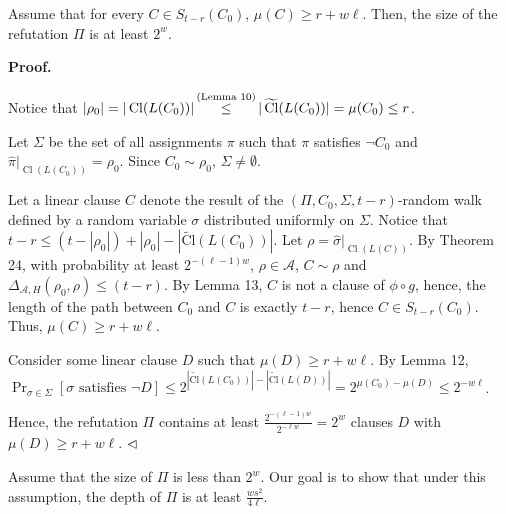 \documentclass[10pt,a4paper]{article}
\begin{document}
Assume that for every $C\in S_{t-r}(C_{0})$, $\mu(C)\geq r+w\ell$. Then, the size of the refutation $\Pi$ is at least $2^{w}$.\par



\par\medskip\noindent\textbf{
Proof.}\par


Notice that $|\rho_{0}|=|\operatorname{Cl}(L(C_{0}))|\mathop{\leq}\limits^{\mbox{\scriptsize(Lemma~10)}}|\operatorname{\widetilde{Cl}}(L(C_{0}))|=\mu(C_{0})\leq r$.\par



Let $\Sigma$ be the set of all assignments $\pi$ such that $\pi$ satisfies $\lnot C_{0}$ and $\hat{\pi}|_{\operatorname{Cl}(L(C_{0}))}=\rho_{0}$. Since $C_{0}\sim\rho_{0}$, $\Sigma\neq\emptyset$.\par



Let a linear clause $C$ denote the result of the $(\Pi,C_{0},\Sigma,t-r)$-random walk defined by a random variable $\sigma$
distributed uniformly on $\Sigma$.
Notice that $t-r\leq(t-|\rho_{0}|)+|\rho_{0}|-|\operatorname{\widetilde{Cl}}(L(C_{0}))|$. Let $\rho=\hat{\sigma}|_{\operatorname{Cl}(L(C))}$.
By Theorem 24, with probability at least $2^{-(\ell-1)w}$, $\rho\in\mathcal{A}$,
$C\sim\rho$ and $\Delta_{\mathcal{A},H}(\rho_{0},\rho)\leq(t-r)$.
By Lemma 13, $C$ is not a clause of $\phi\circ g$,
hence, the length of the path between $C_{0}$ and $C$ is exactly $t-r$, hence $C\in S_{t-r}(C_{0})$.
Thus, $\mu(C)\geq r+w\ell$.\par



Consider some linear clause $D$ such that $\mu(D)\geq r+w\ell$.
By Lemma 12,
$\Pr_{\sigma\in\Sigma}[\mbox{$\sigma$ satisfies $\lnot D$}]\leq 2^{|\operatorname{\widetilde{Cl}}(L(C_{0}))|-|\operatorname{\widetilde{Cl}}(L(D))|}=2^{\mu(C_{0})-\mu(D)}\leq 2^{-w\ell}$.\par



Hence, the refutation $\Pi$ contains at least $\frac{2^{-(\ell-1)w}}{2^{-\ell w}}=2^{w}$ clauses $D$ with $\mu(D)\geq r+w\ell$.
$\hfill\vartriangleleft$\par



Assume that the size of $\Pi$ is less than $2^{w}$. Our goal is to show that under this assumption, the depth of
$\Pi$ is at least $\frac{ws^{2}}{4\ell}$.\par
\end{document}
